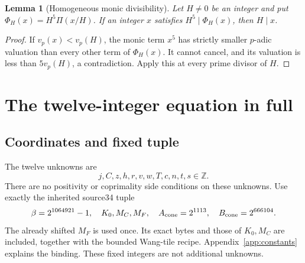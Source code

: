 \documentclass[11pt,letterpaper]{article}
\newtheorem{lemma}[theorem]{Lemma}
\theoremstyle{definition}\newtheorem{definition}[theorem]{Definition}
\theoremstyle{remark}\newtheorem{remark}[theorem]{Remark}
\newcommand{\Z}{\mathbb Z}\newcommand{\N}{\mathbb N}\newcommand{\Q}{\mathbb Q}
\begin{document}
\begin{lemma}[Homogeneous monic divisibility]\label{lem:homogeneous}
Let $H\ne0$ be an integer and put $\Phi_H(x)=H^5\Pi(x/H)$. If an integer $x$ satisfies $H^5\mid\Phi_H(x)$, then $H\mid x$.
\end{lemma}
\begin{proof}
If $v_p(x)<v_p(H)$, the monic term $x^5$ has strictly smaller $p$-adic valuation than every other term of $\Phi_H(x)$. It cannot cancel, and its valuation is less than $5v_p(H)$, a contradiction. Apply this at every prime divisor of $H$.
\end{proof}

\section{The twelve-integer equation in full}
\subsection{Coordinates and fixed tuple}
The twelve unknowns are
\[
 j,C,z,h,r,v,w,T,c,n,t,s\in\Z.
 \tag{7}\label{eq:vars12}
\]
There are no positivity or coprimality side conditions on these unknowns. Use exactly the inherited source34 tuple
\[
 \beta=2^{1064921}-1,\quad K_0,M_C,M_F,
 \quad A_{\rm cone}=2^{1113},\quad B_{\rm cone}=2^{666104}.
\]
The already shifted $M_F$ is used once. Its exact bytes and those of $K_0,M_C$ are included, together with the bounded Wang-tile recipe. Appendix~\ref{app:constants} explains the binding. These fixed integers are not additional unknowns.
\end{document}
